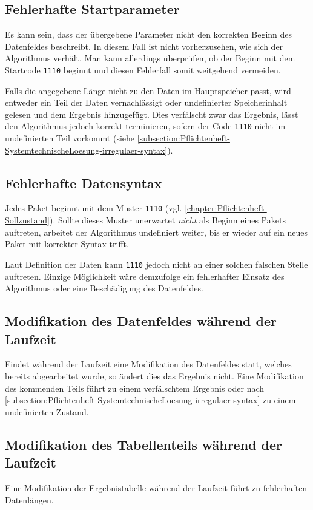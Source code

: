 \subsection{Fehlerhafte Startparameter}
\label{subsection:Pflichtenheft-SystemtechnischeLoesung-irregulaer-startparameter}

Es kann sein, dass der übergebene Parameter nicht den korrekten Beginn des Datenfeldes beschreibt. In diesem Fall ist nicht vorherzusehen, wie sich der Algorithmus verhält. Man kann allerdings überprüfen, ob der Beginn mit dem Startcode \texttt{1110} beginnt und diesen Fehlerfall somit weitgehend vermeiden.

Falls die angegebene Länge nicht zu den Daten im Hauptspeicher passt, wird entweder ein Teil der Daten vernachlässigt oder undefinierter Speicherinhalt gelesen und dem Ergebnis hinzugefügt. Dies verfälscht zwar das Ergebnis, lässt den Algorithmus jedoch korrekt terminieren, sofern der Code \texttt{1110} nicht im undefinierten Teil vorkommt (siehe \autoref{subsection:Pflichtenheft-SystemtechnischeLoesung-irregulaer-syntax}).

\subsection{Fehlerhafte Datensyntax}
\label{subsection:Pflichtenheft-SystemtechnischeLoesung-irregulaer-syntax}

Jedes Paket beginnt mit dem Muster \texttt{1110} (vgl. \autoref{chapter:Pflichtenheft-Sollzustand}). Sollte dieses Muster unerwartet \emph{nicht} als Beginn eines Pakets auftreten, arbeitet der Algorithmus undefiniert weiter, bis er wieder auf ein neues Paket mit korrekter Syntax trifft.

Laut Definition der Daten kann \texttt{1110} jedoch nicht an einer solchen falschen Stelle auftreten. Einzige Möglichkeit wäre demzufolge ein fehlerhafter Einsatz des Algorithmus oder eine Beschädigung des Datenfeldes.

\subsection{Modifikation des Datenfeldes während der Laufzeit}
\label{subsection:Pflichtenheft-SystemtechnischeLoesung-irregulaer-moddatenfeld}

Findet während der Laufzeit eine Modifikation des Datenfeldes statt, welches bereits abgearbeitet wurde, so ändert dies das Ergebnis nicht. Eine Modifikation des kommenden Teils führt zu einem verfälschtem Ergebnis oder nach \autoref{subsection:Pflichtenheft-SystemtechnischeLoesung-irregulaer-syntax} zu einem undefinierten Zustand.

\subsection{Modifikation des Tabellenteils während der Laufzeit}
\label{subsection:Pflichtenheft-SystemtechnischeLoesung-irregulaer-modtabelle}

Eine Modifikation der Ergebnistabelle während der Laufzeit führt zu fehlerhaften Datenlängen. 
